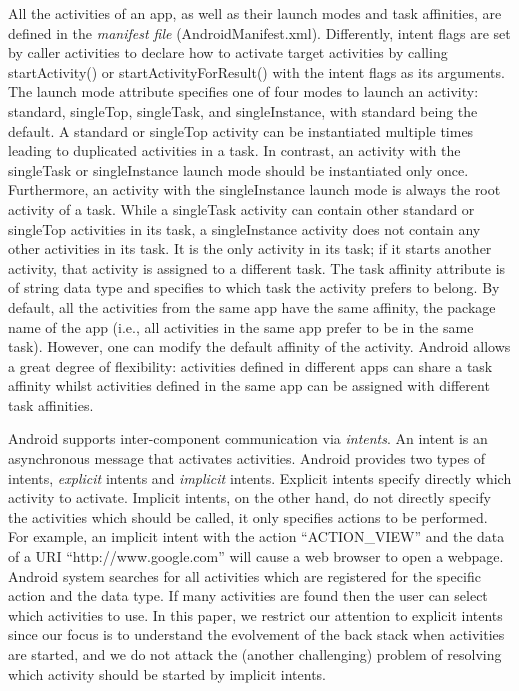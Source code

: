  All the activities of an app, as well as their launch modes and task affinities, are defined in the \emph{manifest file}  
 ({\sf AndroidManifest.xml}). Differently, intent flags are set by caller activities to declare how to activate target activities by calling startActivity() or startActivityForResult() with the intent flags as its arguments. The launch mode attribute  specifies one of four modes to launch an activity: standard, singleTop, singleTask, and singleInstance, with standard being the default. A standard or singleTop activity can be instantiated multiple times leading to duplicated activities in a task. In contrast, an activity with the singleTask or singleInstance launch mode should be instantiated only once. Furthermore, an activity with the singleInstance launch mode is always the root activity of a task. While a singleTask activity
 can contain other standard or singleTop activities in its task, a singleInstance activity does not contain any other
 activities in its task. It is the only activity in its task; if it starts another activity, that activity is assigned to a different task. 
The task affinity attribute is of string data type and specifies to which task the activity prefers to belong. By default, all the activities from the same app have the same affinity, the package name of the app (i.e., all activities in the same app prefer to be in the same task). However, one can modify the default affinity of the activity. Android allows a great degree of flexibility: activities defined in different apps can share a task affinity whilst activities defined in the same app can be assigned with different task affinities.  

 
Android supports inter-component communication via \emph{intents}. An intent is an asynchronous message that activates activities. 
Android provides two types of intents, \emph{explicit} intents and \emph{implicit} intents. 
Explicit intents specify directly which activity to activate. Implicit intents, on the other hand, do not directly specify the activities which should be called, it only specifies actions to be performed. 
For example, an implicit intent with the action ``ACTION\_VIEW'' and the data of a URI ``http://www.google.com'' will cause a web browser to open a webpage. 
Android system searches for all activities which are registered for the specific action and the data type. If many activities are found then the user can select which activities to use.
In this paper, we restrict our attention to explicit intents since our focus is to understand the evolvement of the back stack when activities are started, and we do not attack the (another challenging) problem of resolving which activity should be started by implicit intents. 

